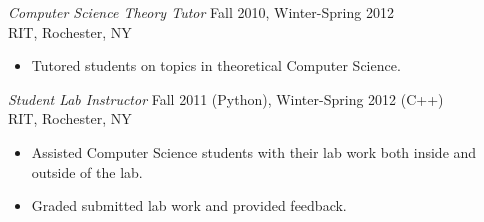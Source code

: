 \documentclass[margin]{res}
\begin{document}
\begin{resume}
                {\sl Computer Science Theory Tutor} \hfill     Fall 2010, Winter-Spring 2012\\
                 RIT, Rochester, NY
                 \begin{itemize} \itemsep -2pt
                 \item Tutored students on topics in theoretical Computer Science.
                \end{itemize}

                {\sl Student Lab Instructor} \hfill            Fall 2011 (Python), Winter-Spring 2012 (C++) \\
                RIT, Rochester, NY
                 \begin{itemize}  \itemsep -2pt %
                 \item Assisted Computer Science students with their lab work both inside and outside of the lab.
                 \item Graded submitted lab work and provided feedback. 
                \end{itemize} 
\end{resume}
\end{document}
